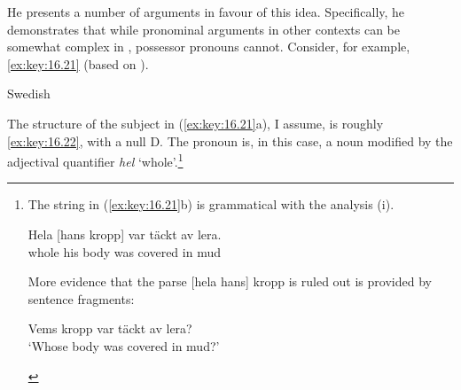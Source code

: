 \documentclass[output=paper]{langsci/langscibook}
\begin{document}
\ea\label{ex:key:16.20}
    \ea
    \ex
    \z
\z

He presents a number of arguments in favour of this idea.  Specifically, he
demonstrates that while pronominal arguments in other contexts can be somewhat
complex in , possessor pronouns cannot. Consider, for example, \eqref{ex:key:16.21}
(based on \citealt{Delsing1998}).\newpage

\ea Swedish\label{ex:key:16.21}
	\z
\z

The structure of the subject in (\ref{ex:key:16.21}a), I assume, is roughly \eqref{ex:key:16.22}, with a null
D.  The pronoun is, in this case, a noun modified by the adjectival quantifier
\emph{hel} `whole'.\footnote{The string in (\ref{ex:key:16.21}b) is grammatical with the
    analysis (i).

\begin{exe}
    \sn
	\gll Hela   [hans kropp] var täckt av lera.\\
		whole his    body    was covered in mud\\
	\glt
\end{exe}

More evidence that the parse [hela hans] kropp is ruled out is provided by
sentence fragments:

\begin{exe}
    \sn Vems kropp var täckt av lera?\\
        `Whose body was covered in mud?'
\end{exe}}
\end{document}
